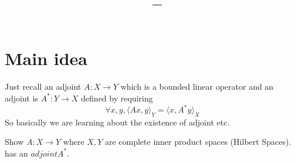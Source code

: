 \documentclass[11pt]{article}
\title{\vspace{-1.5em}\textbf{\coursename\ -- \lecturetitle}}
\author{\studentname}
\date{\lecturedate}
\newcommand{\1}{\mathbf{1}}
\theoremstyle{notestyle}
\theoremstyle{definition}
\begin{document}
\maketitle

\section{Main idea}
Just recall an adjoint $A : X \rightarrow Y$ which is a bounded linear operator and an
adjoint is $A^* : Y \rightarrow X$ defined by requiring $$\forall x,y,  \langle Ax, y\rangle_Y =
\langle x, A^* y\rangle_X$$
So basically we are learning about the existence of adjoint etc.

Show $A : X \rightarrow Y$ where $X, Y$ are complete inner product spaces (Hilbert Spaces). has an $adjoint A^*$.
 
\end{document}
